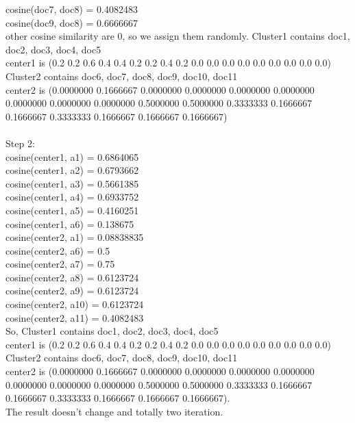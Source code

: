 \documentclass{article}
\begin{document}
		cosine(doc7, doc8) = 0.4082483 \\
		cosine(doc9, doc8) = 0.6666667 \\
		other cosine similarity are 0, so we assign them randomly. 
		Cluster1 contains doc1, doc2, doc3, doc4, doc5 \\
		center1 is (0.2 0.2 0.6 0.4 0.4 0.2 0.2 0.4 0.2 0.0 0.0 0.0 0.0 0.0 0.0 0.0 0.0 0.0)
		Cluster2 contains doc6, doc7, doc8, doc9, doc10, doc11 \\
		center2 is (0.0000000 0.1666667 0.0000000 0.0000000 0.0000000 0.0000000 0.0000000 0.0000000 0.0000000 0.5000000 0.5000000 0.3333333 0.1666667 0.1666667 0.3333333 0.1666667 0.1666667 0.1666667) \\ \\
		Step 2: \\
		cosine(center1, a1) = 0.6864065 \\
		cosine(center1, a2) = 0.6793662 \\
		cosine(center1, a3) = 0.5661385 \\
		cosine(center1, a4) = 0.6933752 \\ 
		cosine(center1, a5) = 0.4160251 \\
		cosine(center1, a6) = 0.138675 \\
		
		cosine(center2, a1) = 0.08838835 \\
		cosine(center2, a6) = 0.5 \\
		cosine(center2, a7) = 0.75 \\
		cosine(center2, a8) = 0.6123724 \\
		cosine(center2, a9) = 0.6123724 \\
		cosine(center2, a10) = 0.6123724 \\
		cosine(center2, a11) = 0.4082483 \\
		So, Cluster1 contains doc1, doc2, doc3, doc4, doc5 \\
		center1 is (0.2 0.2 0.6 0.4 0.4 0.2 0.2 0.4 0.2 0.0 0.0 0.0 0.0 0.0 0.0 0.0 0.0 0.0)
		Cluster2 contains doc6, doc7, doc8, doc9, doc10, doc11 \\
		center2 is (0.0000000 0.1666667 0.0000000 0.0000000 0.0000000 0.0000000 0.0000000 0.0000000 0.0000000 0.5000000 0.5000000 0.3333333 0.1666667 0.1666667 0.3333333 0.1666667 0.1666667 0.1666667). \\
		The result doesn't change and totally two 
		iteration.
	
\end{document}
